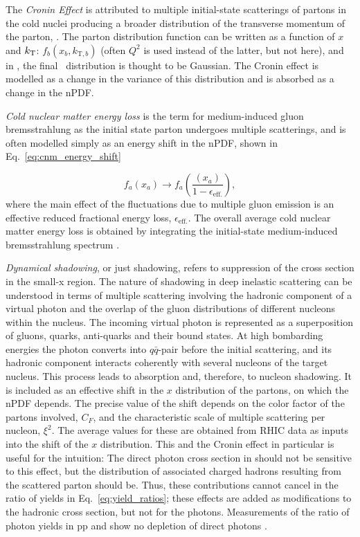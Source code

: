 The \textit{Cronin Effect} is attributed to multiple initial-state scatterings of partons in the cold nuclei producing a broader distribution of the transverse momentum of the parton, \kt. The parton distribution function can be written as a function of $x$ and  $k_\mathrm{T}$: $f_{b}(x_b,k_{\mathrm{T},b})$ (often $Q^2$ is used instead of the latter, but not here), and in \cite{Kang2012}, the final \kt~distribution is thought to be Gaussian. The Cronin effect is modelled as a change in the variance of this distribution and is absorbed as a change in the nPDF.

\textit{Cold nuclear matter energy loss} is the term for medium-induced gluon bremsstrahlung as the initial state parton undergoes multiple scatterings, and is often modelled simply as an energy shift in the nPDF, shown in Eq.~\ref{eq:cnm_energy_shift}

  \begin{equation}
    f_{a}(x_a) \rightarrow f_{a}(\frac{(x_a)}{1-\epsilon_\mathrm{eff.}}),
    \label{eq:cnm_energy_shift}
  \end{equation}
where the main effect of the fluctuations due to multiple gluon emission is an effective reduced fractional energy loss, $\epsilon_\mathrm{eff.}$. The overall average cold nuclear matter energy loss is obtained by integrating the initial-state medium-induced bremsstrahlung spectrum \cite{Vitev2007}. 

\textit{Dynamical shadowing}, or just shadowing, refers to suppression of the cross section in the small-x region. The nature of shadowing in deep inelastic scattering can be understood in terms of multiple scattering involving the hadronic component of a virtual photon and the overlap of the gluon distributions of different nucleons within the nucleus. The incoming virtual photon is represented as a superposition of gluons, quarks, anti-quarks and their bound states. At high bombarding energies the photon converts into $q\bar{q}$-pair before the initial scattering, and its hadronic component interacts coherently with several nucleons of the target nucleus. This process leads to absorption and, therefore, to nucleon shadowing\cite{Tywoniuk2007}. It is included as an effective shift in the $x$ distribution of the partons, on which the nPDF depends. The precise value of the shift depends on the color factor of the partons involved, $C_F$, and the characteristic scale of multiple scattering per nucleon, $\xi^2$. The average values for these are obtained from RHIC data as inputs into the shift of the $x$ distribution\cite{Kang2012}.
This and the Cronin effect in particular is useful for the intuition: The direct photon cross section in \pPb should not be sensitive to this effect, but the distribution of associated charged hadrons resulting from the scattered parton should be. Thus, these contributions cannot cancel in the ratio of yields in Eq.~\ref{eq:yield_ratios}; these effects are added as modifications to the hadronic cross section, but not for the photons. Measurements of the ratio of photon yields in pp and \pPb show no depletion of direct photons \cite{Masson2019}.

